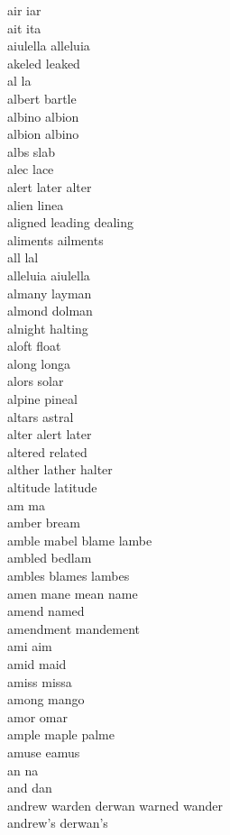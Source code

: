 air iar\\
ait ita\\
aiulella alleluia\\
akeled leaked\\
al la\\
albert bartle\\
albino albion\\
albion albino\\
albs slab\\
alec lace\\
alert later alter\\
alien linea\\
aligned leading dealing\\
aliments ailments\\
all lal\\
alleluia aiulella\\
almany layman\\
almond dolman\\
alnight halting\\
aloft float\\
along longa\\
alors solar\\
alpine pineal\\
altars astral\\
alter alert later\\
altered related\\
alther lather halter\\
altitude latitude\\
am ma\\
amber bream\\
amble mabel blame lambe\\
ambled bedlam\\
ambles blames lambes\\
amen mane mean name\\
amend named\\
amendment mandement\\
ami aim\\
amid maid\\
amiss missa\\
among mango\\
amor omar\\
ample maple palme\\
amuse eamus\\
an na\\
and dan\\
andrew warden derwan warned wander\\
andrew's derwan's\\
